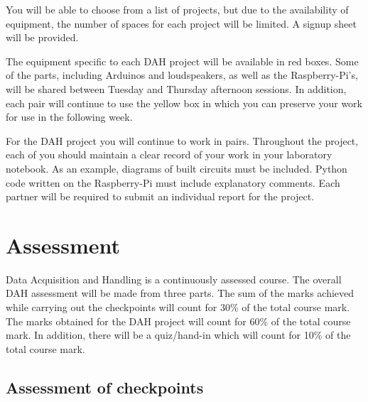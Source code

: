 You will be able to choose from a list of projects, but due to the availability of equipment, the number of spaces for each project will be limited. 
A signup sheet will be provided.

The equipment specific to each DAH project will be available in red boxes. Some of the parts, including Arduinos and loudspeakers, as well as the Raspberry-Pi's, will be shared between Tuesday and Thursday afternoon sessions. In addition, each pair will continue to use the yellow box in which you can preserve your work for use in the following week. 

For the DAH project you will continue to work in pairs. Throughout the project, each of you should maintain a clear record of your work in your laboratory notebook. As an example, diagrams of built circuits must be included. Python code written on the Raspberry-Pi must include explanatory comments.  Each partner will be required to submit an individual report for the project. 
\vfill
\newpage

\section{Assessment} 

Data Acquisition and Handling is a continuously assessed course. The overall DAH  assessment will be made from three parts. The sum of the marks achieved while carrying out the checkpoints will count for 30\% of the total course mark.  The marks obtained for the DAH project will count for 60\% of the total course mark. In addition, there will be a quiz/hand-in which will count for 10\% of the total course mark.

\subsection{Assessment of checkpoints}

